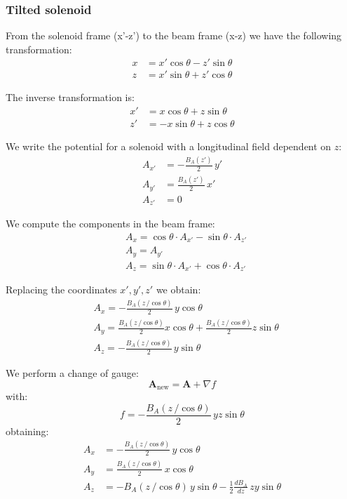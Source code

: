 \subsubsection{Tilted solenoid}

From the solenoid frame (x'-z') to the beam frame (x-z) we have the following transformation:
\begin{align}
x &= x' \cos\theta - z' \sin\theta \\
z &= x' \sin\theta + z' \cos\theta
\end{align}

The inverse transformation is:
\begin{align}
x' &= x \cos\theta + z \sin\theta \\
z' &= -x \sin\theta + z \cos\theta
\end{align}

We write the potential for a solenoid with a longitudinal field dependent on $z$:
\begin{align}
A_{x'} &= -\frac{B_A(z')}{2} \, y' \\
A_{y'} &= \frac{B_A(z')}{2} \, x' \\
A_{z'} &= 0
\end{align}

We compute the components in the beam frame:
\begin{align}
&A_x = \cos\theta \cdot A_{x'} - \sin\theta \cdot A_{z'} \\
&A_y = A_{y'} \\
&A_z = \sin\theta \cdot A_{x'} + \cos\theta \cdot A_{z'}
\end{align}

Replacing the coordinates $x', y', z'$ we obtain:
\begin{align}
&A_x = -\frac{B_A(z\,/\cos \theta)}{2} \, y \cos\theta \\
&A_y = \frac{B_A(z\,/\cos \theta)}{2} x \cos\theta + \frac{B_A(z\,/\cos \theta)}{2} z \sin\theta \\
&A_z = -\frac{B_A(z\,/\cos \theta)}{2} \, y \sin\theta
\end{align}

We perform a change of gauge:
\begin{equation}
\mathbf{A}_\text{new} = \mathbf{A} + \nabla f
\end{equation}
with:
\begin{equation}
f = -\frac{B_A(z\,/\cos \theta)}{2} \, y z \sin\theta
\end{equation}
obtaining:
\begin{align}
A_x &= -\frac{B_A(z\,/\cos \theta)}{2} \, y \cos\theta \\
A_y &= \frac{B_A(z\,/\cos \theta)}{2} \, x \cos\theta \\
A_z &= -B_A(z\,/\cos \theta) \, y \sin\theta - \frac{1}{2} \frac{dB_A}{dz} \, z y \sin\theta
\end{align}


